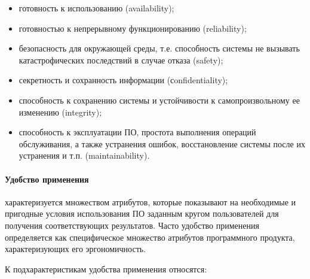\documentclass{../../text-style}
\begin{document}
\begin{itemize}
    \item готовность к использованию (availability);
    \item готовностью к непрерывному функционированию (reliability);
    \item безопасность для окружающей среды, т.е. способность системы не вызывать катастрофических последствий в случае отказа (safety);
    \item секретность и сохранность информации (сonfidentiality);
    \item способность к сохранению системы и устойчивости к самопроизвольному ее изменению (integrity);
    \item способность к эксплуатации ПО, простота выполнения операций обслуживания, а также устранения ошибок, восстановление системы после их устранения и т.п. (maintainability).
\end{itemize}

\paragraph{Удобство применения} характеризуется множеством атрибутов, которые показывают на необходимые и пригодные условия использования ПО заданным кругом пользователей для получения соответствующих результатов. Часто удобство применения определяется как специфическое множество атрибутов программного продукта, характеризующих его эргономичность.

К подхарактеристикам удобства применения относятся:
\end{document}
